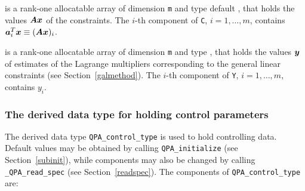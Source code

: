 \documentclass{galahad}
\newcommand{\packagename}{QPA}
\newcommand{\fullpackagename}{\libraryname\_\packagename}
\begin{document}
\begin{description}
 is a rank-one allocatable array of dimension {\tt m} and type default 
\realdp, that holds
the values ${\bm{A}} {\bm{x}}$ of the constraints.
The $i$-th component of {\tt C}, $i = 1,  \ldots ,  m$, contains 
${\bm{a}}_{i}^{T}{\bm{x}} \equiv ({\bm{A}} {\bm{x}})_{i}$.  

 is a rank-one allocatable array of dimension {\tt m} and type 
\realdp, that holds
the values ${\bm{y}}$ of estimates  of the Lagrange multipliers
corresponding to the general linear constraints (see Section~\ref{galmethod}).
The $i$-th component of {\tt Y}, $i = 1,  \ldots ,  m$, contains $y_{i}$.  

\end{description}


\subsubsection{The derived data type for holding control 
 parameters}\label{typecontrol}
The derived data type 
{\tt \packagename\_control\_type} 
is used to hold controlling data. Default values may be obtained by calling 
{\tt \packagename\_initialize}
(see Section~\ref{subinit}),
while components may also be changed by calling 
{\tt \fullpackagename\_read\-\_spec}
(see Section~\ref{readspec}). 
The components of 
{\tt \packagename\_control\_type} 
are:



\end{document}
